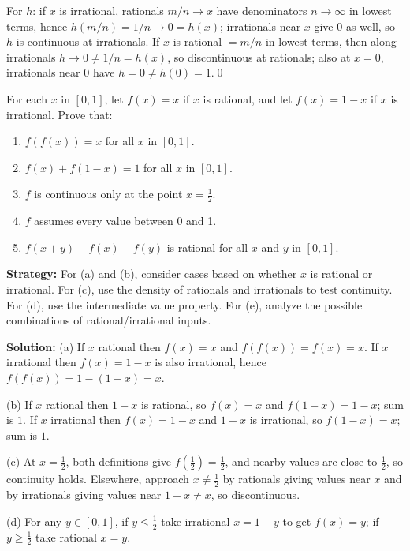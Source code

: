 For $h$: if $x$ is irrational, rationals $m/n\to x$ have denominators $n\to\infty$ in lowest terms, hence $h(m/n)=1/n\to 0=h(x)$; irrationals near $x$ give $0$ as well, so $h$ is continuous at irrationals. If $x$ is rational $=m/n$ in lowest terms, then along irrationals $h\to 0\ne 1/n=h(x)$, so discontinuous at rationals; also at $x=0$, irrationals near $0$ have $h=0\ne h(0)=1$.\qed



\begin{problembox}
For each \( x \) in \([0, 1]\), let \( f(x) = x \) if \( x \) is rational, and let \( f(x) = 1 - x \) if \( x \) is irrational. Prove that:
\begin{enumerate}[label=(\alph*)]
\item \( f(f(x)) = x \) for all \( x \) in \([0, 1]\).
\item \( f(x) + f(1 - x) = 1 \) for all \( x \) in \([0, 1]\).
\item \( f \) is continuous only at the point \( x = \frac{1}{2} \).
\item \( f \) assumes every value between 0 and 1.
\item \( f(x + y) - f(x) - f(y) \) is rational for all \( x \) and \( y \) in \([0, 1]\).
\end{enumerate}
\end{problembox}

\noindent\textbf{Strategy:} For (a) and (b), consider cases based on whether $x$ is rational or irrational. For (c), use the density of rationals and irrationals to test continuity. For (d), use the intermediate value property. For (e), analyze the possible combinations of rational/irrational inputs.

\bigskip\noindent\textbf{Solution:}
(a) If $x$ rational then $f(x)=x$ and $f(f(x))=f(x)=x$. If $x$ irrational then $f(x)=1-x$ is also irrational, hence $f(f(x))=1-(1-x)=x$.

(b) If $x$ rational then $1-x$ is rational, so $f(x)=x$ and $f(1-x)=1-x$; sum is $1$. If $x$ irrational then $f(x)=1-x$ and $1-x$ is irrational, so $f(1-x)=x$; sum is $1$.

(c) At $x=\tfrac12$, both definitions give $f(\tfrac12)=\tfrac12$, and nearby values are close to $\tfrac12$, so continuity holds. Elsewhere, approach $x\ne\tfrac12$ by rationals giving values near $x$ and by irrationals giving values near $1-x\ne x$, so discontinuous.

(d) For any $y\in[0,1]$, if $y\le \tfrac12$ take irrational $x=1-y$ to get $f(x)=y$; if $y\ge \tfrac12$ take rational $x=y$.

